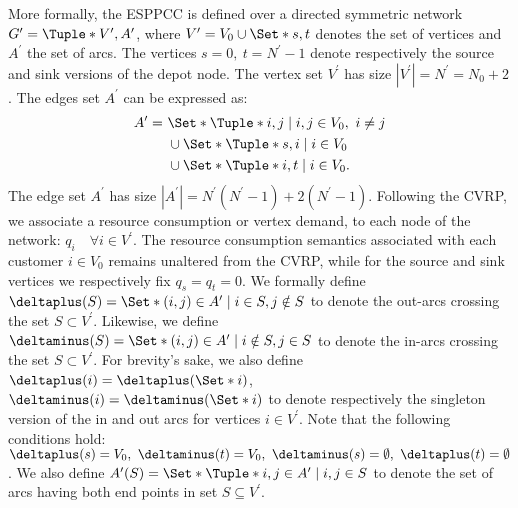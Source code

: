 More formally, the ESPPCC is defined over a directed symmetric network
$G^\prime = \Tuple*{V^\prime, A^\prime}$,
where $V^\prime = V_0 \cup \Set*{s, t}$ denotes the set of vertices and $A^\prime$ the set of arcs.
The vertices $s = 0,\ t = N^\prime - 1$ denote respectively the source and sink versions of the depot node.
The vertex set $V^\prime$ has size $|V^\prime| = N^\prime = N_0 + 2$.
The edges set $A^\prime$ can be expressed as:
\begin{equation}
	\begin{aligned}
		A^\prime = \  & \Set*{\Tuple*{i, j} \mid i, j \in V_0,\ i \ne j} \\
		              & \cup \Set*{\Tuple*{s, i} \mid i \in V_0}         \\
		              & \cup \Set*{\Tuple*{i, t} \mid i \in V_0}.
	\end{aligned}
\end{equation}
The edge set $A^\prime$ has size $|A^\prime| = N^\prime(N^\prime - 1) + 2(N^\prime - 1)$.
Following the CVRP,
we associate a resource consumption or vertex demand,
to each node of the network: $q_i \quad \forall i \in V^\prime$.
The resource consumption semantics associated with each customer
$i \in V_0$ remains unaltered  from the CVRP, while for the source and sink vertices
we respectively fix $q_{s} = q_{t} = 0$.
We formally define $\deltaplus(S) = \Set*{(i, j) \in A^\prime \mid i \in S, j \notin S}$
to denote the out-arcs crossing the set $S \subset V^\prime$.
Likewise, we define $\deltaminus(S) = \Set*{(i, j) \in A^\prime \mid i \notin S, j \in S}$
to denote the in-arcs crossing the set $S \subset V^\prime$.
For brevity’s sake,
we also define $\deltaplus(i) = \deltaplus(\Set*{i})$, $\deltaminus(i) = \deltaminus(\Set*{i})$
to denote respectively the singleton version of the in and out arcs for vertices $i \in V^\prime$.
Note that the following conditions hold:
$\deltaplus(s) = V_0,\ \deltaminus(t) = V_0,\ \deltaminus(s) = \emptyset,\ \deltaplus(t) = \emptyset$.
We also define $A^\prime(S) = \Set*{\Tuple*{i, j} \in A^\prime \mid i, j \in S}$
to denote the set of arcs having both end points in set $S \subseteq V^\prime$.

